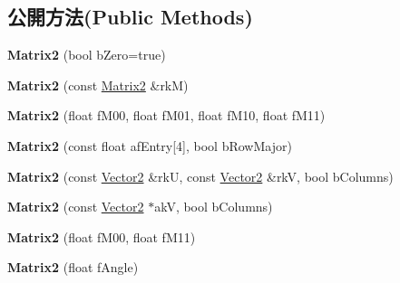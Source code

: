 \subsection*{公開方法(Public Methods)}
\begin{DoxyCompactItemize}
\item 
{\bfseries Matrix2} (bool b\+Zero=true)\hypertarget{class_magnum_1_1_matrix2_ab50d6fe9bf5eaeb9a2ef74d230cc347b}{}\label{class_magnum_1_1_matrix2_ab50d6fe9bf5eaeb9a2ef74d230cc347b}

\item 
{\bfseries Matrix2} (const \hyperlink{class_magnum_1_1_matrix2}{Matrix2} \&rkM)\hypertarget{class_magnum_1_1_matrix2_a10dfcf818e95a0fe0e6794e5840c6f41}{}\label{class_magnum_1_1_matrix2_a10dfcf818e95a0fe0e6794e5840c6f41}

\item 
{\bfseries Matrix2} (float f\+M00, float f\+M01, float f\+M10, float f\+M11)\hypertarget{class_magnum_1_1_matrix2_a2e99f42e0b760a4460df62dec26582f6}{}\label{class_magnum_1_1_matrix2_a2e99f42e0b760a4460df62dec26582f6}

\item 
{\bfseries Matrix2} (const float af\+Entry\mbox{[}4\mbox{]}, bool b\+Row\+Major)\hypertarget{class_magnum_1_1_matrix2_aa8afb2552644a486eb6bdae773e71d6e}{}\label{class_magnum_1_1_matrix2_aa8afb2552644a486eb6bdae773e71d6e}

\item 
{\bfseries Matrix2} (const \hyperlink{class_magnum_1_1_vector2}{Vector2} \&rkU, const \hyperlink{class_magnum_1_1_vector2}{Vector2} \&rkV, bool b\+Columns)\hypertarget{class_magnum_1_1_matrix2_afec5b244ff4c02a0c15e4876627433b1}{}\label{class_magnum_1_1_matrix2_afec5b244ff4c02a0c15e4876627433b1}

\item 
{\bfseries Matrix2} (const \hyperlink{class_magnum_1_1_vector2}{Vector2} $\ast$akV, bool b\+Columns)\hypertarget{class_magnum_1_1_matrix2_a247b4221354dec0e66305395d1a71635}{}\label{class_magnum_1_1_matrix2_a247b4221354dec0e66305395d1a71635}

\item 
{\bfseries Matrix2} (float f\+M00, float f\+M11)\hypertarget{class_magnum_1_1_matrix2_acd2cd414f0468ce8d692d0b7c1108b8f}{}\label{class_magnum_1_1_matrix2_acd2cd414f0468ce8d692d0b7c1108b8f}

\item 
{\bfseries Matrix2} (float f\+Angle)\hypertarget{class_magnum_1_1_matrix2_a81ce001af50e812f6852eeef8e0cc249}{}\label{class_magnum_1_1_matrix2_a81ce001af50e812f6852eeef8e0cc249}


\end{DoxyCompactItemize}
